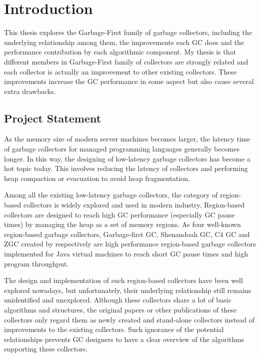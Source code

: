 \chapter{Introduction}
\label{cha:intro}

This thesis explores the Garbage-First family of garbage collectors, including
the underlying relationship among them, the improvements each GC does and the performance
contribution by each algorithmic component.
My thesis is that different members in Garbage-First family of collectors are strongly related
and each collector is actually an improvement to other existing collectors.
These improvements increase the GC performance in some aspect but also cause several extra drawbacks.

\section{Project Statement}

As the memory size of modern server machines becomes larger, the latency time of
garbage collectors for managed programming languages generally becomes longer.
In this way, the designing of low-latency garbage collectors has become
a hot topic today. This involves reducing the latency of collectors and
performing heap compaction or evacuation to avoid heap fragmentation.

Among all the existing low-latency garbage collectors, the category of region-based
collectors is widely explored and used in modern industry.
Region-based collectors are designed to reach high GC
performance (especially GC pause times) by managing the heap as a set of memory regions.
As four well-known region-based garbage collectors,
Garbage-first GC, Shenandoah GC, C4 GC and ZGC created by
\citep{detlefs2004garbage,flood2016shenandoah,tene2011c4,liden_karlsson_2018} respectively
are high performance region-based garbage collectors implemented for Java virtual machines
to reach short GC pause times and high program throughput.

The design and implementation of such region-based collectors have been well
explored nowadays, but unfortunately, their underlying relationship still remains unidentified and unexplored.
Although these collectors share a lot of basic algorithms and structures,
the original papers or other publications of these collectors only regard them as
newly created and stand-alone collectors instead of improvements to the existing collectors.
Such ignorance of the potential relationships prevents GC designers to have a clear
overview of the algorithms supporting these collectors.


